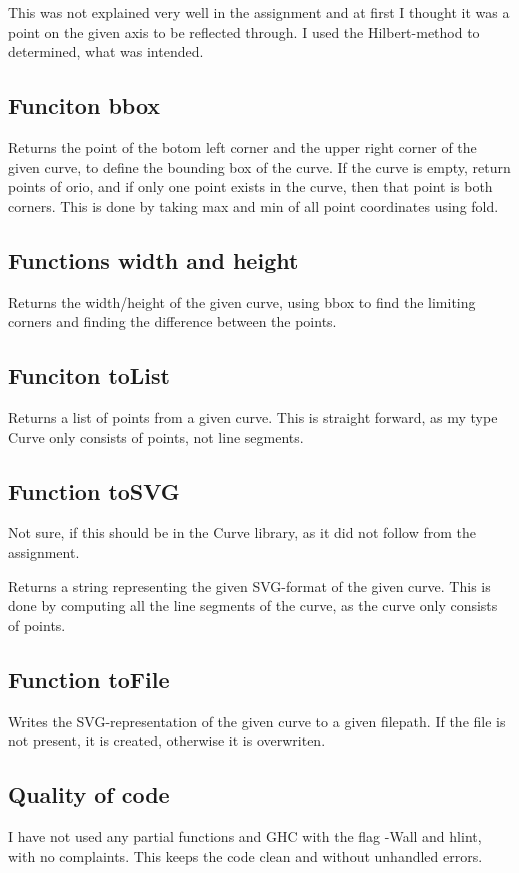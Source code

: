 \documentclass[a4paper, 10pt]{article}
\begin{document}
This was not explained very well in the assignment and at first I thought it was a point on the given axis to be reflected through.
I used the Hilbert-method to determined, what was intended. 

\subsection*{Funciton bbox}
Returns the point of the botom left corner and the upper right corner of the given curve, to define the bounding box of the curve. If the curve is empty, return points of orio, and if only one point exists in the curve, then that point is both corners. This is done by taking max and min of all point coordinates using fold.

\subsection*{Functions width and height}
Returns the width/height of the given curve, using bbox to find the limiting corners and finding the difference between the points.

\subsection*{Funciton toList}
Returns a list of points from a given curve. This is straight forward, as my type Curve only consists of points, not line segments.

\subsection*{Function toSVG}
Not sure, if this should be in the Curve library, as it did not follow from the assignment.

Returns a string representing the given SVG-format of the given curve. This is done by computing all the line segments of the curve, as the curve only consists of points.

\subsection*{Function toFile}
Writes the SVG-representation of the given curve to a given filepath. If the file is not present, it is created, otherwise it is overwriten.

\subsection*{Quality of code}
I have not used any partial functions and GHC with the flag -Wall and hlint, with no complaints. This keeps the code clean and without unhandled errors.
\end{document}
